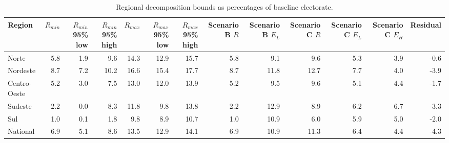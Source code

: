 \begin{table}
\caption{Regional decomposition bounds as percentages of baseline electorate.}
\label{tab:regional-decomposition-bounds}
\centering
\begin{adjustbox}{width=\textwidth}
\begin{tabular}{lrrrrrrrrrrrr}
\toprule
Region & $R_{min}$ & $R_{min}$ 95\% low & $R_{min}$ 95\% high & $R_{max}$ & $R_{max}$ 95\% low & $R_{max}$ 95\% high & Scenario B $R$ & Scenario B $E_L$ & Scenario C $R$ & Scenario C $E_L$ & Scenario C $E_H$ & Residual \\
\midrule
Norte & 5.8 & 1.9 & 9.6 & 14.3 & 12.9 & 15.7 & 5.8 & 9.1 & 9.6 & 5.3 & 3.9 & -0.6 \\
Nordeste & 8.7 & 7.2 & 10.2 & 16.6 & 15.4 & 17.7 & 8.7 & 11.8 & 12.7 & 7.7 & 4.0 & -3.9 \\
Centro-Oeste & 5.2 & 3.0 & 7.5 & 13.0 & 12.0 & 13.9 & 5.2 & 9.5 & 9.6 & 5.1 & 4.4 & -1.7 \\
Sudeste & 2.2 & 0.0 & 8.3 & 11.8 & 9.8 & 13.8 & 2.2 & 12.9 & 8.9 & 6.2 & 6.7 & -3.3 \\
Sul & 1.0 & 0.1 & 1.8 & 9.8 & 8.9 & 10.7 & 1.0 & 10.9 & 6.0 & 5.9 & 5.0 & -2.0 \\
National & 6.9 & 5.1 & 8.6 & 13.5 & 12.9 & 14.1 & 6.9 & 10.9 & 11.3 & 6.4 & 4.4 & -4.3 \\
\bottomrule
\end{tabular}
\end{adjustbox}
\end{table}
